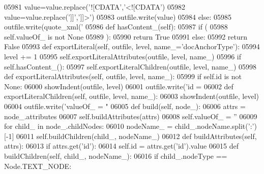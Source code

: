 \begin{DoxyCode}
{{{{{{{{{{{{{{{{{{{{{{{{{{{{{{{{{{{{{{{{{{{{{{{{{{{{{{{{{{{{{{{{{{{{{{{{{{{{{{{{{{{{{{{{{{{{{{{{{{{{{{{{{{{{{{{{{{{{{{{{{{{{{{{{{{{{{{{{{{{{{{{{{{{{{{{{{{{{{{{{{{{{{{{{{{{{{{{{{{{{{{{{{{{{{{{{{{{{{{{{{{{{{{{{{{{{{{{{{{{{{{{{{{{{{{{{{{{{{{{{{{{{{{{{{{{{{{{{{{{{{{{{{{{{{{{{{{{{{{{{{{{{{{{{{{{{{{{{{{{{{{{{{{{{{{{{{{{{{{{{{{{{{{{{{{{{{{{{{{{{{{{{{{{{{{{{{{{{{{{{{{{{{{{{{{{{05981             value=value.replace(\textcolor{stringliteral}{'![CDATA'},\textcolor{stringliteral}{'<![CDATA'})
05982             value=value.replace(\textcolor{stringliteral}{']]'},\textcolor{stringliteral}{']]>'})
05983             outfile.write(value)
05984         \textcolor{keywordflow}{else}:
05985             outfile.write(quote_xml(\textcolor{stringliteral}{'%
05986     \textcolor{keyword}{def }hasContent_(self):
05987         \textcolor{keywordflow}{if} (
05988             self.valueOf_ \textcolor{keywordflow}{is} \textcolor{keywordflow}{not} \textcolor{keywordtype}{None}
05989             ):
05990             \textcolor{keywordflow}{return} \textcolor{keyword}{True}
05991         \textcolor{keywordflow}{else}:
05992             \textcolor{keywordflow}{return} \textcolor{keyword}{False}
05993     \textcolor{keyword}{def }exportLiteral(self, outfile, level, name\_='docAnchorType'):
05994         level += 1
05995         self.exportLiteralAttributes(outfile, level, name\_)
05996         \textcolor{keywordflow}{if} self.hasContent_():
05997             self.exportLiteralChildren(outfile, level, name\_)
05998     \textcolor{keyword}{def }exportLiteralAttributes(self, outfile, level, name\_):
05999         \textcolor{keywordflow}{if} self.id \textcolor{keywordflow}{is} \textcolor{keywordflow}{not} \textcolor{keywordtype}{None}:
06000             showIndent(outfile, level)
06001             outfile.write(\textcolor{stringliteral}{'id = %
06002     \textcolor{keyword}{def }exportLiteralChildren(self, outfile, level, name\_):
06003         showIndent(outfile, level)
06004         outfile.write(\textcolor{stringliteral}{'valueOf\_ = "%
06005     \textcolor{keyword}{def }build(self, node\_):
06006         attrs = node\_.attributes
06007         self.buildAttributes(attrs)
06008         self.valueOf_ = \textcolor{stringliteral}{''}
06009         \textcolor{keywordflow}{for} child\_ \textcolor{keywordflow}{in} node\_.childNodes:
06010             nodeName\_ = child\_.nodeName.split(\textcolor{stringliteral}{':'})[-1]
06011             self.buildChildren(child\_, nodeName\_)
06012     \textcolor{keyword}{def }buildAttributes(self, attrs):
06013         \textcolor{keywordflow}{if} attrs.get(\textcolor{stringliteral}{'id'}):
06014             self.id = attrs.get(\textcolor{stringliteral}{'id'}).value
06015     \textcolor{keyword}{def }buildChildren(self, child\_, nodeName\_):
06016         \textcolor{keywordflow}{if} child\_.nodeType == Node.TEXT\_NODE:
}}}}}}}}}}}}}}}}}}}}}}}}}}}}}}}}}}}}}}}}}}}}}}}}}}}}}}}}}}}}}}}}}}}}}}}}}}}}}}}}}}}}}}}}}}}}}}}}}}}}}}}}}}}}}}}}}}}}}}}}}}}}}}}}}}}}}}}}}}}}}}}}}}}}}}}}}}}}}}}}}}}}}}}}}}}}}}}}}}}}}}}}}}}}}}}}}}}}}}}}}}}}}}}}}}}}}}}}}}}}}}}}}}}}}}}}}}}}}}}}}}}}}}}}}}}}}}}}}}}}}}}}}}}}}}}}}}}}}}}}}}}}}}}}}}}}}}}}}}}}}}}}}}}}}}}}}}}}}}}}}}}}}}}}}}}}}}}}}}}}}}}}}}}}}}}}}}}}}}}}}}}}}}}}}}}}}}}
\end{DoxyCode}
